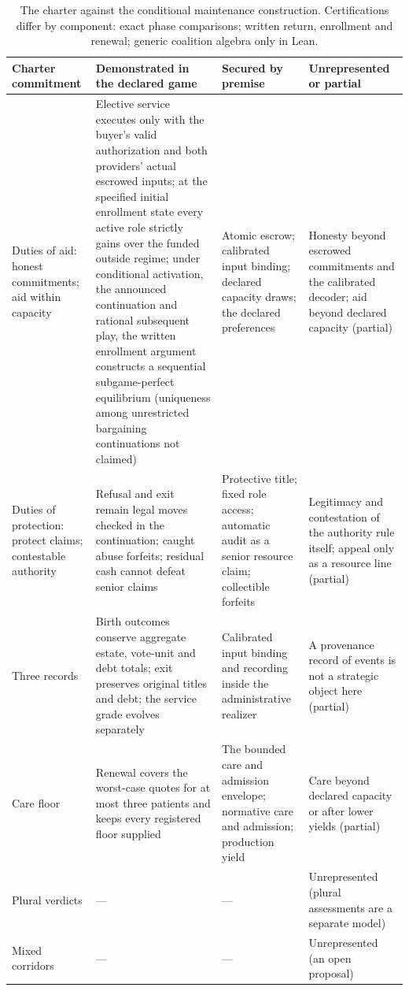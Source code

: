 \documentclass[pdflatex,sn-basic]{sn-jnl}%
\newcommand{\tablerows}{\renewcommand{\arraystretch}{1.6}}%
\begin{document}
\begin{appendices}
\begin{table}[!htbp]
  \centering\scriptsize
  \caption{The charter against the conditional maintenance construction. Certifications differ by component: exact phase comparisons; written return, enrollment and renewal; generic coalition algebra only in Lean.}
  \label{tab:crosswalk}
  \tablerows
  \begin{tabularx}{\textwidth}{@{}>{\raggedright\arraybackslash}p{2.1cm}>{\raggedright\arraybackslash}X>{\raggedright\arraybackslash}X>{\raggedright\arraybackslash}X@{}}
    \toprule
    Charter commitment & Demonstrated in the declared game & Secured by premise & Unrepresented or partial\\
    \midrule
    Duties of aid: honest commitments; aid within capacity & Elective service executes only with the buyer's valid authorization and both providers' actual escrowed inputs; at the specified initial enrollment state every active role strictly gains over the funded outside regime; under conditional activation, the announced continuation and rational subsequent play, the written enrollment argument constructs a sequential subgame-perfect equilibrium (uniqueness among unrestricted bargaining continuations not claimed) & Atomic escrow; calibrated input binding; declared capacity draws; the declared preferences & Honesty beyond escrowed commitments and the calibrated decoder; aid beyond declared capacity (partial)\\
    Duties of protection: protect claims; contestable authority & Refusal and exit remain legal moves checked in the continuation; caught abuse forfeits; residual cash cannot defeat senior claims & Protective title; fixed role access; automatic audit as a senior resource claim; collectible forfeits & Legitimacy and contestation of the authority rule itself; appeal only as a resource line (partial)\\
    Three records & Birth outcomes conserve aggregate estate, vote-unit and debt totals; exit preserves original titles and debt; the service grade evolves separately & Calibrated input binding and recording inside the administrative realizer & A provenance record of events is not a strategic object here (partial)\\
    Care floor & Renewal covers the worst-case quotes for at most three patients and keeps every registered floor supplied & The bounded care and admission envelope; normative care and admission; production yield & Care beyond declared capacity or after lower yields (partial)\\
    Plural verdicts & --- & --- & Unrepresented (plural assessments are a separate model)\\
    Mixed corridors & --- & --- & Unrepresented (an open proposal)\\
    \bottomrule
  \end{tabularx}
\end{table}


\end{appendices}
\end{document}
